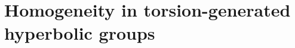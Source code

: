\documentclass[a4paper, 11pt]{amsart}
\newtheorem{te}{Theorem}[section]
\theoremstyle{definition}
\newtheorem{fact}[te]{Fact}
\newtheorem{de}[te]{Definition}
\theoremstyle{remark}
\newtheorem{rk}[te]{Remark}
\begin{document}






\section{Homogeneity in torsion-generated hyperbolic groups}\label{homogeneity_hyperbolic}
\end{document}
